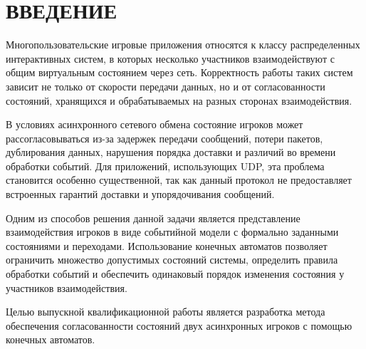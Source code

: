 \chapter*{ВВЕДЕНИЕ}

Многопользовательские игровые приложения относятся к классу распределенных интерактивных систем, в которых несколько участников взаимодействуют с общим виртуальным состоянием через сеть. Корректность работы таких систем зависит не только от скорости передачи данных, но и от согласованности состояний, хранящихся и обрабатываемых на разных сторонах взаимодействия.

В условиях асинхронного сетевого обмена состояние игроков может рассогласовываться из-за задержек передачи сообщений, потери пакетов, дублирования данных, нарушения порядка доставки и различий во времени обработки событий. Для приложений, использующих UDP, эта проблема становится особенно существенной, так как данный протокол не предоставляет встроенных гарантий доставки и упорядочивания сообщений.

Одним из способов решения данной задачи является представление взаимодействия игроков в виде событийной модели с формально заданными состояниями и переходами. Использование конечных автоматов позволяет ограничить множество допустимых состояний системы, определить правила обработки событий и обеспечить одинаковый порядок изменения состояния у участников взаимодействия.

Целью выпускной квалификационной работы является разработка метода обеспечения согласованности состояний двух асинхронных игроков с помощью конечных автоматов.

